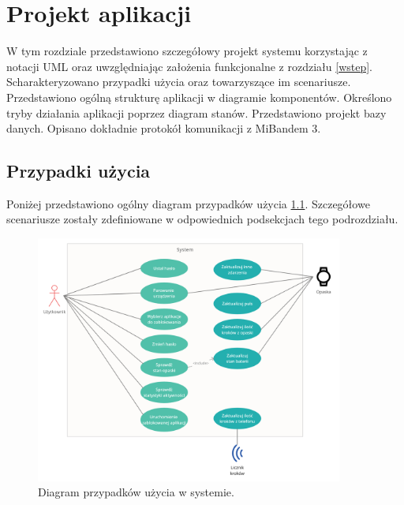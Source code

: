 \chapter{Projekt aplikacji}
\thispagestyle{chapterBeginStyle}
\label{rozdzial2}
W tym rozdziale przedstawiono szczegółowy projekt systemu korzystając z notacji UML oraz uwzględniając założenia funkcjonalne z rozdziału \ref{wstep}.
Scharakteryzowano przypadki użycia oraz towarzyszące im scenariusze. Przedstawiono ogólną strukturę aplikacji w diagramie komponentów. Określono tryby działania aplikacji poprzez diagram stanów. Przedstawiono projekt bazy danych. Opisano dokładnie protokół komunikacji z MiBandem 3. 

\section{Przypadki użycia}
Poniżej przedstawiono ogólny diagram przypadków użycia \ref{use_case}. Szczegółowe scenariusze zostały zdefiniowane w odpowiednich podsekcjach tego podrozdziału.
\begin{figure}[H]
    \begin{center}
        \includegraphics[width=0.9\textwidth]{UseCaseDiagram.png}
    \end{center}
    \caption{{\color{dgray}Diagram przypadków użycia w systemie.}} \label{use_case}
\end{figure}

